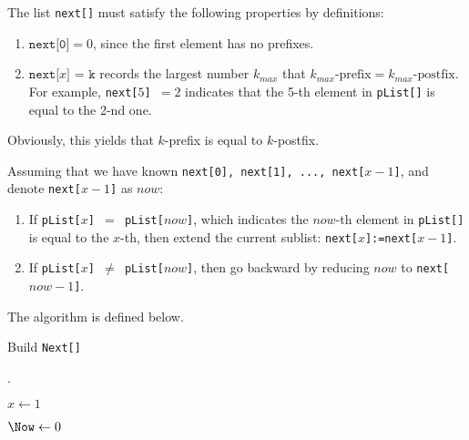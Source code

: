 


\def\HWTITLE{Homework 5}
\def\COURSECODE{CS 225: Data Structures}
\def\AUTHOR{Group D1}



\makeMyTitle
\thispagestyle{firstPage}

\begin{questions}

    The list \texttt{next[]} must satisfy the following properties by definitions:
    \begin{enumerate}
        \item $\texttt{next[0]} = 0$, since the first element has no prefixes.
        \item $\texttt{next[$x$] = k}$ records the largest number $k_{max}$ that $ k_{max}\mbox{-prefix} = k_{max}\mbox{-postfix}$. For example, \texttt{next[$5$] $= 2$} indicates that the 5-th element in \texttt{pList[]} is equal to the 2-nd one.
    \end{enumerate}

    Obviously, this yields that $k$-prefix is equal to $k$-postfix.

    Assuming that we have known \texttt{next[0], next[1], ..., next[$x-1$]}, and denote \texttt{next[$x-1$]} as $now$:
    
    \begin{enumerate}
        \item If \texttt{pList[$x$] $=$ pList[$now$]}, which indicates the $now$-th element in \texttt{pList[]} is equal to the $x$-th, then extend the current sublist: \texttt{next[$x$]:=next[$x-1$]}.
        
        \item If \texttt{pList[$x$] $\neq$ pList[$now$]}, then go backward by reducing $now$ to \texttt{next[$now-1$]}.
    \end{enumerate}

    The algorithm is defined below.

    \begin{algorithm}
        \caption{Build \texttt{Next[]}}
        \label{alg-build-next}

        \Next.

        $x \gets 1$

        $\Now \gets 0$


\end{algorithm}
\end{questions}
